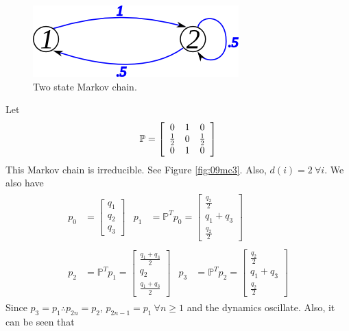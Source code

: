 \begin{figure}[ht!]
	\centering
	\includegraphics[width=.4\textwidth]{images/09mc2}
	\caption{Two state Markov chain.}
	\label{fig:09mc2}
\end{figure}

\begin{example}
Let
$$\mathbb{P} = \left[\begin{array}{c c c} 0 & 1 & 0 \\ \frac{1}{2} & 0 & \frac{1}{2} \\ 0 & 1 & 0 \end{array}\right]$$
This Markov chain is irreducible. See Figure \ref{fig:09mc3}. Also, $d(i)=2 ~\forall i$. We also have
\begin{align*}
\begin{split}
p_0 &= \left[\begin{array}{c} q_1 \\ q_2 \\ q_3 \end{array}\right]
\end{split}
\begin{split}
p_1 &= \mathbb{P}^Tp_0 = \left[\begin{array}{c} \frac{q_2}{2} \\ q_1+q_3 \\ \frac{q_2}{2} \end{array}\right]
\end{split} \\
\begin{split}
p_2 &= \mathbb{P}^Tp_1 = \left[\begin{array}{c} \frac{q_1+q_3}{2} \\ q_2 \\ \frac{q_1+q_3}{2} \end{array}\right]
\end{split}
\begin{split}
p_3 &= \mathbb{P}^Tp_2 = \left[\begin{array}{c} \frac{q_2}{2} \\ q_1+q_3 \\ \frac{q_2}{2} \end{array}\right]
\end{split}
\end{align*}
Since $p_3=p_1 \therefore p_{2n}=p_2$, $p_{2n-1}=p_1 ~\forall n\geq1$ and the dynamics oscillate. Also, it can be seen that

\end{example}
